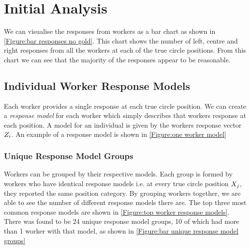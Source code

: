 \section{Initial Analysis}

We can visualise the responses from workers as a bar chart as shown in \ref{Figure:bar responses no gold}. 
This chart shows the number of left, centre and right responses from all the workers at each of the true circle positions. 
From this chart we can see that the majority of the responses appear to be reasonable.






\subsection{Individual Worker Response Models}

Each worker provides a single response at each true circle position. 
We can create a \textit{ response model} for each worker which simply describes that workers response at each position. 
A model for an individual is given by the workers response vector $Z_i$. 
An example of a response model is shown in \ref{Figure:one worker model}


\subsubsection{Unique Response Model Groups}
Workers can be grouped by their respective models. 
Each group is formed by workers who have identical response models i.e. at every true circle position $X_j$, they reported the same position category. 
By grouping workers together, we are able to see the number of different response models there are. 
The top three most common response models are shown in \ref{Figure:top worker response models}. 
There was found to be 24 unique response model groups, 10 of which had more than 1 worker with that model, as shown in \ref{Figure:bar unique response model groups}

